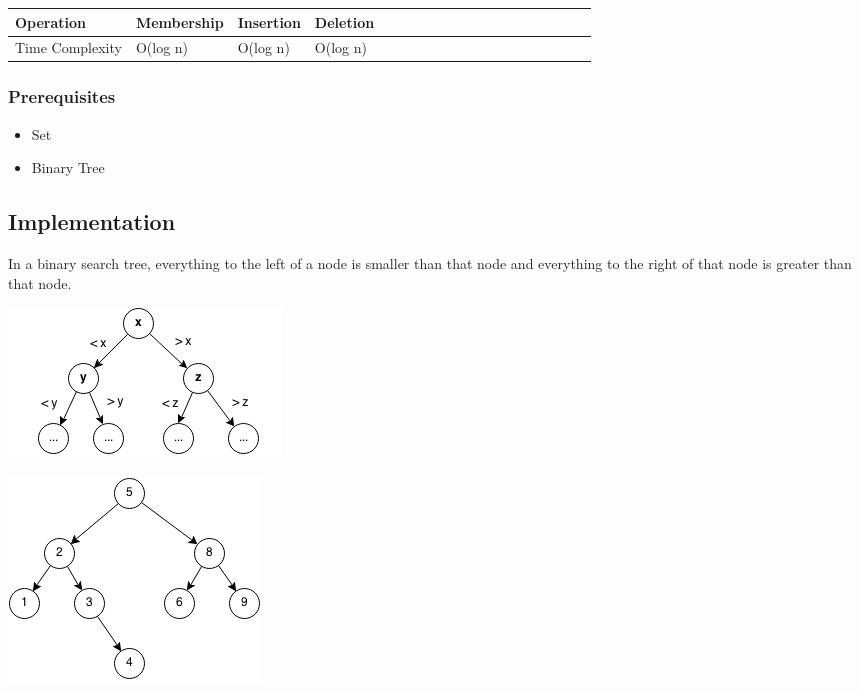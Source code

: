 \documentclass[11pt,oneside]{book}
\makeatletter
\def\maxwidth#1{\ifdim\Gin@nat@width>#1 #1\else\Gin@nat@width\fi}
\makeatother
\begin{document}
\vspace{10px}\begin{tabulary}{0.4\linewidth}{|l|l|l|l|l|l|l|l|l|l|l|l|l|l|l|l|l|l|l}\hline


  Operation &
  Membership &
  Insertion &
  Deletion\\
\hline


  Time Complexity &
  O(log n) &
  O(log n) &
  O(log n)\\

\hline\end{tabulary}

\subsubsection{Prerequisites}

\begin{itemize}
\item Set
\item Binary Tree
\end{itemize}

\subsection{Implementation}

In a binary search tree, everything to the left of a node is smaller than that node and everything to the right of that node is greater than that node.

\vspace{5px}\includegraphics[width=\maxwidth{\textwidth}]{bstcompare.png}

\vspace{5px}\includegraphics[width=\maxwidth{\textwidth}]{bst.png}
\end{document}
